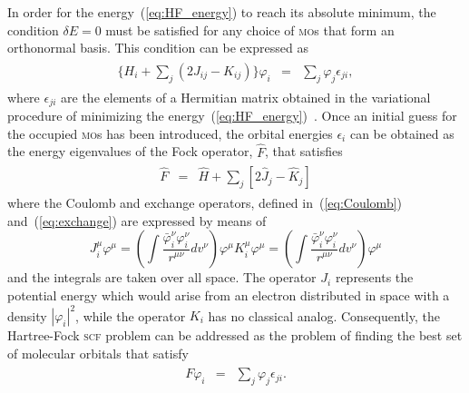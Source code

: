 In order for the energy~(\ref{eq:HF_energy}) to reach its absolute
minimum, the condition $\delta E = 0$ must be satisfied for any choice
of \textsc{mo}s that form an orthonormal basis. This condition can be
expressed as~\cite{Roothaan_HF,Levine_QChem}
%
\begin{eqnarray}
  \begin{split}
    \{H_{i} + \sum\limits_{j} ( 2J_{ij} - K_{ij} ) \} \varphi_{i} & = &
    \sum\limits_{j} \varphi_{j} \epsilon_{ji},
  \end{split}
\label{eq:deltaEzero}
\end{eqnarray}
%
where $\epsilon_{ji}$ are the elements of a Hermitian matrix obtained
in the variational procedure of minimizing the
energy~(\ref{eq:HF_energy})~\cite{Roothaan_HF}. Once an initial guess
for the occupied \textsc{mo}s has been introduced, the orbital
energies $\epsilon_{i}$ can be obtained as the energy eigenvalues of
the Fock operator, $\hat{F}$, that satisfies
%
\begin{eqnarray}
  \begin{split}
    \hat{F} & = & \hat{H} +
    \sum\limits_{j} [ 2\hat{J}_{j} - \hat{K}_{j} ]
  \end{split}
  \label{eq:F_operator}
\end{eqnarray}
%
where the Coulomb and exchange operators, defined
in~(\ref{eq:Coulomb}) and~(\ref{eq:exchange}) are expressed by means of
%
\begin{subequations}
  \begin{equation}\label{eq:one_indxJ}
    J_{i}^{\mu} \varphi^{\mu} = \left( \int
    \frac{\bar\varphi_{i}^{\nu} \varphi_{i}^{\nu}}
         {r^{\mu\nu}} dv^{\nu}
         \right) \varphi^{\mu}
  \end{equation}
  \begin{equation}\label{eq:one_indxK}
    K_{i}^{\mu} \varphi^{\mu} = \left( \int
    \frac{\bar\varphi_{i}^{\nu} \varphi_{i}^{\nu}}
         {r^{\mu\nu}} dv^{\nu}
         \right) \varphi^{\mu}
  \end{equation}
\end{subequations}
%
and the integrals are taken over all space. The operator $J_{i}$
represents the potential energy which would arise from an electron
distributed in space with a density $|\varphi_{i}|^{2}$, while the
operator $K_{i}$ has no classical analog. Consequently, the
Hartree-Fock \textsc{scf} problem can be addressed as the problem of
finding the best set of molecular orbitals that
satisfy~\cite{Roothaan_HF,Levine_QChem}
%
\begin{eqnarray}
  \begin{split}
    F \varphi_{i} & = & \sum\limits_{j} \varphi_{j} \epsilon_{ji}.
  \end{split}
  \label{eq:Fock_operator_problem}
\end{eqnarray}
